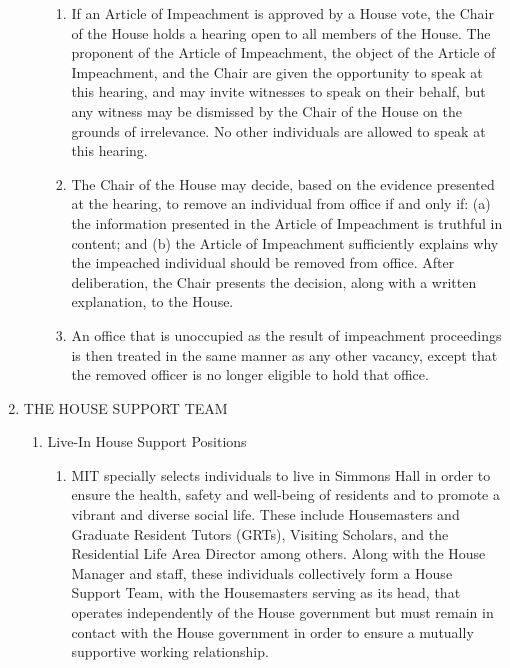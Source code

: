 \documentclass[letterpaper]{article}
\begin{document}
\begin{enumerate}
\begin{enumerate}
\begin{enumerate}
\item If an Article of Impeachment is approved by a House vote, the Chair of the House holds a hearing open to all members of the House. The proponent of the Article of Impeachment, the object of the Article of Impeachment, and the Chair are given the opportunity to speak at this hearing, and may invite witnesses to speak on their behalf, but any witness may be dismissed by the Chair of the House on the grounds of irrelevance. No other individuals are allowed to speak at this hearing.

\item The Chair of the House may decide, based on the evidence presented at the hearing, to remove an individual from office if and only if: (a) the information presented in the Article of Impeachment is truthful in content; and (b) the Article of Impeachment sufficiently explains why the impeached individual should be removed from office. After deliberation, the Chair presents the decision, along with a written explanation, to the House.

\item An office that is unoccupied as the result of impeachment proceedings is then treated in the same manner as any other vacancy, except that the removed officer is no longer eligible to hold that office.
 
\end{enumerate}

\end{enumerate}

\item THE HOUSE SUPPORT TEAM 

\begin{enumerate}

\item Live-In House Support Positions 

\begin{enumerate}

\item MIT specially selects individuals to live in Simmons Hall in order to ensure the health, safety and well-being of residents and to promote a vibrant and diverse social life. These include Housemasters and Graduate Resident Tutors (GRTs), Visiting Scholars, and the Residential Life Area Director among others. Along with the House Manager and staff, these individuals collectively form a House Support Team, with the Housemasters serving as its head, that operates independently of
the House government but must remain in contact with the House government in order to ensure a mutually supportive working relationship.


\end{enumerate}
\end{enumerate}
\end{enumerate}
\end{document}
